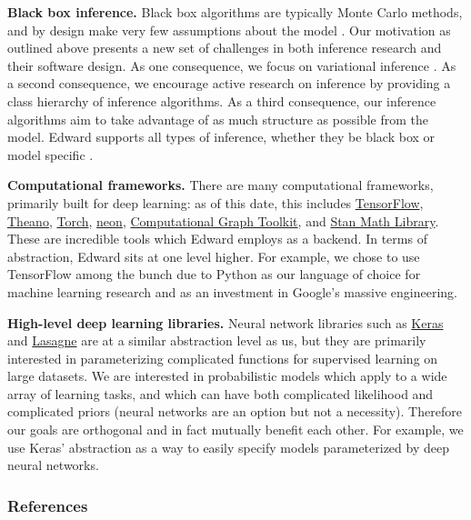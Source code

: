 \textbf{Black box inference.}
Black box algorithms are typically Monte Carlo methods, and
by design make very few assumptions about the
model \citep{metropolis1949monte,hastings1970monte}.
Our motivation as outlined above presents a new set of
challenges in both inference research and their software design.
As one consequence, we focus on variational
inference \citep{hinton1993keeping,waterhouse1996bayesian,jordan1999introduction}.
As a second consequence, we encourage active research
on inference by providing a class hierarchy of inference algorithms.
As a third consequence, our inference
algorithms aim to take advantage of as much structure as possible from
the model. Edward supports all types of inference, whether they
be black box or model specific \citep{dempster1977maximum,hoffman2013stochastic}.

\textbf{Computational frameworks.}
There are many computational frameworks, primarily built for deep
learning: as of this date, this includes
\href{https://www.tensorflow.org}{TensorFlow},
\href{http://deeplearning.net/software/theano/}{Theano},
\href{http://torch.ch}{Torch},
\href{https://github.com/NervanaSystems/neon}{neon},
\href{http://rll.berkeley.edu/cgt/}{Computational Graph Toolkit}, and
\href{https://github.com/stan-dev/math}{Stan Math Library}. These are
incredible tools which Edward employs as a backend. In
terms of abstraction, Edward sits at one level higher. For example,
we chose to use TensorFlow among the bunch due to Python as our language
of choice for machine learning research and as an investment in Google's
massive engineering.

\textbf{High-level deep learning libraries.}
Neural network libraries such as
\href{https://github.com/fchollet/keras}{Keras} and
\href{https://github.com/Lasagne/Lasagne}{Lasagne} are at a similar
abstraction level as us, but they are primarily interested in
parameterizing complicated functions for supervised learning on large
datasets. We are interested in probabilistic models which apply
to a wide array of learning tasks, and which can have both
complicated likelihood and complicated priors (neural networks are an
option but not a necessity). Therefore our goals are orthogonal and in
fact mutually benefit each other. For example, we use Keras'
abstraction as a way to easily specify models parameterized by deep
neural networks.

\subsubsection{References}\label{references}
